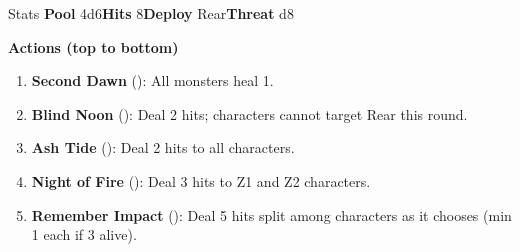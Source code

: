 \begin{monsterentry}{Stats}
\textbf{Pool} 4d6\quad\textbf{Hits} 8\quad\textbf{Deploy} Rear\quad\textbf{Threat} d8

\textbf{Actions (top to bottom)}
\begin{enumerate}\setlength{\itemsep}{0.15em}\setlength{\parskip}{0pt}
  \item \textbf{Second Dawn} (\easy): All monsters heal 1.
  \item \textbf{Blind Noon} (\medium): Deal 2 hits; characters cannot target Rear this round.
  \item \textbf{Ash Tide} (\hard): Deal 2 hits to all characters.
  \item \textbf{Night of Fire} (\hard): Deal 3 hits to Z1 and Z2 characters.
  \item \textbf{Remember Impact} (\hard): Deal 5 hits split among characters as it chooses (min 1 each if 3 alive).
\end{enumerate}
\end{monsterentry}

